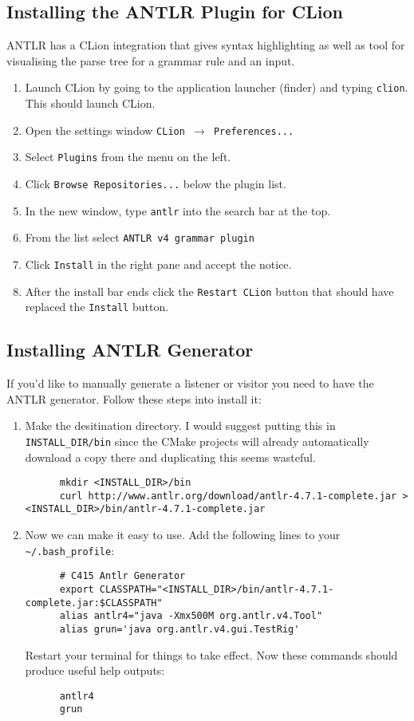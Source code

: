 \documentclass[../setup.tex]{subfiles}
\begin{document}
\subsection{Installing the ANTLR Plugin for CLion}
ANTLR has a CLion integration that gives syntax highlighting as well as tool for visualising the
parse tree for a grammar rule and an input.
\begin{enumerate}
  \item
    Launch CLion by going to the application launcher (finder) and typing \lstinline{clion}. This
    should launch CLion.
  \item
    Open the settings window \texttt{CLion $\rightarrow$ Preferences...}
  \item
    Select \texttt{Plugins} from the menu on the left.
  \item
    Click \texttt{Browse Repositories...} below the plugin list.
  \item
    In the new window, type \texttt{antlr} into the search bar at the top.
  \item
    From the list select \lstinline{ANTLR v4 grammar plugin}
  \item
    Click \texttt{Install} in the right pane and accept the notice.
  \item
    After the install bar ends click the \texttt{Restart CLion} button that should have replaced
    the \texttt{Install} button.
\end{enumerate}

\subsection{Installing ANTLR Generator}
If you'd like to manually generate a listener or visitor you need to have the ANTLR generator.
Follow these steps into install it:
\begin{enumerate}
  \item
    Make the desitination directory. I would suggest putting this in \lstinline{INSTALL_DIR/bin}
    since the CMake projects will already automatically download a copy there and duplicating
    this seems wasteful.
    \begin{lstlisting}
      mkdir <INSTALL_DIR>/bin
      curl http://www.antlr.org/download/antlr-4.7.1-complete.jar > <INSTALL_DIR>/bin/antlr-4.7.1-complete.jar
    \end{lstlisting}
  \item
    Now we can make it easy to use. Add the following lines to your \lstinline{~/.bash_profile}:
    \begin{lstlisting}
      # C415 Antlr Generator
      export CLASSPATH="<INSTALL_DIR>/bin/antlr-4.7.1-complete.jar:$CLASSPATH"
      alias antlr4="java -Xmx500M org.antlr.v4.Tool"
      alias grun='java org.antlr.v4.gui.TestRig'
    \end{lstlisting}
    Restart your terminal for things to take effect. Now these commands should produce useful help
    outputs:
    \begin{lstlisting}
      antlr4
      grun
    \end{lstlisting}
\end{enumerate}
\end{document}
